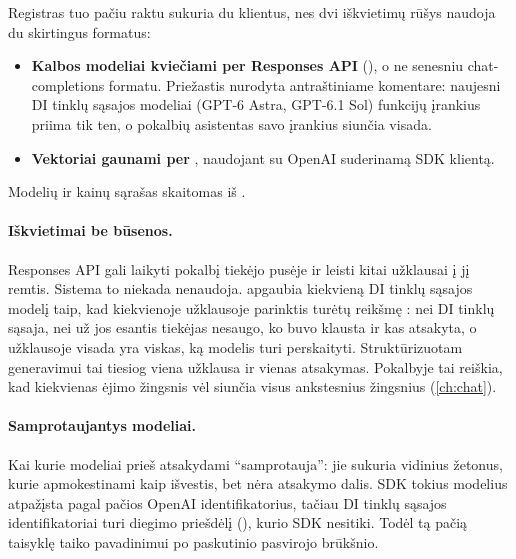 Registras tuo pačiu raktu sukuria du klientus, nes dvi iškvietimų rūšys naudoja du skirtingus
formatus:

\begin{itemize}
  \item \textbf{Kalbos modeliai kviečiami per Responses API} (), o ne
    senesniu chat-completions formatu. Priežastis nurodyta 
    antraštiniame komentare: naujesni DI tinklų sąsajos modeliai (GPT-6 Astra, GPT-6.1 Sol)
    funkcijų įrankius priima tik ten, o pokalbių asistentas savo įrankius siunčia visada.
  \item \textbf{Vektoriai gaunami per} , naudojant su OpenAI suderinamą
    SDK klientą.
\end{itemize}

Modelių ir kainų sąrašas skaitomas iš .

\paragraph{Iškvietimai be būsenos.} Responses API gali laikyti pokalbį tiekėjo pusėje ir leisti
kitai užklausai į jį remtis. Sistema to niekada nenaudoja.  apgaubia
kiekvieną DI tinklų sąsajos modelį taip, kad kiekvienoje užklausoje parinktis 
turėtų reikšmę : nei DI tinklų sąsaja, nei už jos esantis tiekėjas nesaugo, ko buvo
klausta ir kas atsakyta, o užklausoje visada yra viskas, ką modelis turi perskaityti.
Struktūrizuotam generavimui tai tiesiog viena užklausa ir vienas atsakymas. Pokalbyje tai
reiškia, kad kiekvienas ėjimo žingsnis vėl siunčia visus ankstesnius žingsnius
(\cref{ch:chat}).

\paragraph{Samprotaujantys modeliai.} Kai kurie modeliai prieš atsakydami
\enquote{samprotauja}: jie sukuria vidinius žetonus, kurie apmokestinami kaip išvestis, bet
nėra atsakymo dalis. SDK tokius modelius atpažįsta pagal pačios OpenAI identifikatorius, tačiau
DI tinklų sąsajos identifikatoriai turi diegimo priešdėlį (), kurio SDK nesitiki.
Todėl  tą pačią taisyklę taiko pavadinimui po paskutinio pasvirojo
brūkšnio.

